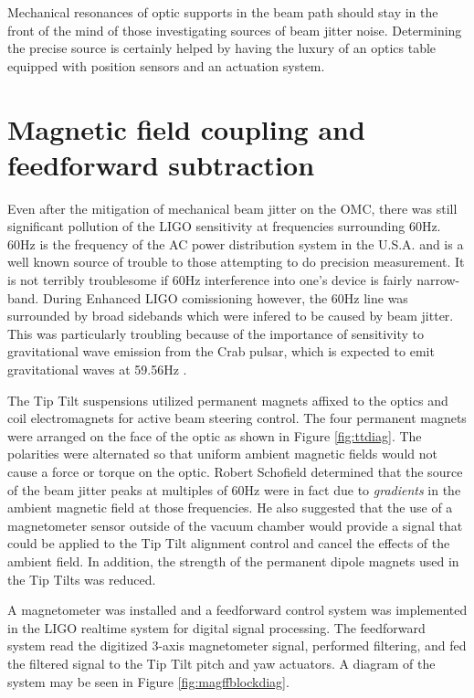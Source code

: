 Mechanical resonances of optic supports in the beam path should stay in the front of the mind of those investigating sources of beam jitter noise. %
Determining the precise source is certainly helped by having the luxury of an optics table equipped with position sensors and an actuation system.
\section{Magnetic field coupling and feedforward subtraction}
Even after the mitigation of mechanical beam jitter on the OMC, there was still significant pollution of the LIGO sensitivity at frequencies surrounding 60Hz. %
60Hz is the frequency of the AC power distribution system in the U.S.A. %
and is a well known source of trouble to those attempting to do precision measurement. %
It is not terribly troublesome if 60Hz interference into one's device is fairly narrow-band. %
During Enhanced LIGO comissioning however, the 60Hz line was surrounded by broad sidebands which were infered to be caused by beam jitter. %
This was particularly troubling because of the importance of sensitivity to gravitational wave emission from the Crab pulsar, which is expected to emit gravitational waves at 59.56Hz \cite{Crab}.

The Tip Tilt suspensions utilized permanent magnets affixed to the optics and coil electromagnets for active beam steering control. %
The four permanent magnets were arranged on the face of the optic as shown in Figure \ref{fig:ttdiag}. %
The polarities were alternated so that uniform ambient magnetic fields would not cause a force or torque on the optic. %
Robert Schofield determined that the source of the beam jitter peaks at multiples of 60Hz were in fact due to \emph{gradients} in the ambient magnetic field at those frequencies. %
He also suggested that the use of a magnetometer sensor outside of the vacuum chamber would provide a signal that could be applied to the Tip Tilt alignment control and cancel the effects of the ambient field. In addition, the strength of the permanent dipole magnets used in the Tip Tilts was reduced.

A magnetometer was installed and a feedforward control system was implemented in the LIGO realtime system for digital signal processing. %
The feedforward system read the digitized 3-axis magnetometer signal, performed filtering, and fed the filtered signal to the Tip Tilt pitch and yaw actuators. %
A diagram of the system may be seen in Figure \ref{fig:magffblockdiag}. %



